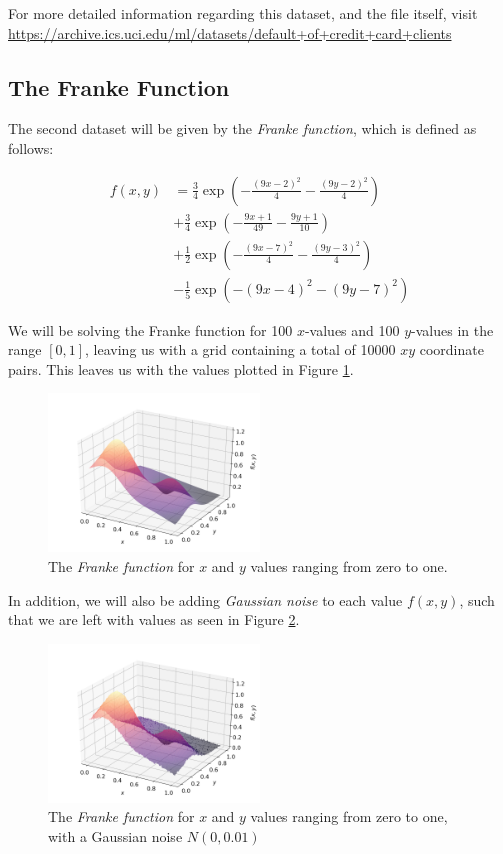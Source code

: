 \documentclass[a4paper,10pt,english]{article}
\begin{document}
\begin{multicols*}{2}
For more detailed information regarding this dataset, and the file itself, visit \url{https://archive.ics.uci.edu/ml/datasets/default+of+credit+card+clients}

\subsection*{The Franke Function}

The second dataset will be given by the \textit{Franke function}, which is defined as follows:

\begin{align*}
f(x,y) &= \frac{3}{4} \exp \left( -\frac{(9x-2)^2}{4} -\frac{(9y-2)^2}{4} \right) \\ &+ \frac{3}{4} \exp \left( -\frac{9x+1}{49} -\frac{9y+1}{10} \right) \\ &+ \frac{1}{2} \exp \left( -\frac{(9x-7)^2}{4} -\frac{(9y-3)^2}{4} \right) \\ &- \frac{1}{5} \exp \left( -(9x-4)^2 - (9y-7)^2 \right)
\end{align*}

We will be solving the Franke function for 100 $x$-values and 100 $y$-values in the range $[0,1]$, leaving us with a grid containing a total of 10000 $xy$ coordinate pairs.  This leaves us with the values plotted in Figure \ref{fig_Franke}.

\begin{figure}[H]
	\centering
	\includegraphics[width = 0.5\textwidth, center]{Franke.png}
	\caption{The \textit{Franke function} for $x$ and $y$ values ranging from zero to one. \label{fig_Franke}}
\end{figure}

In addition, we will also be adding \textit{Gaussian noise} to each value $f(x,y)$, such that we are left with values as seen in Figure \ref{fig_Franke_noise}.

\begin{figure}[H]
	\centering
	\includegraphics[width = 0.5\textwidth, center]{Franke_noise.png}
	\caption{The \textit{Franke function} for $x$ and $y$ values ranging from zero to one, with a Gaussian noise $N(0,0.01)$\label{fig_Franke_noise}}
\end{figure}


\end{multicols*}
\end{document}
